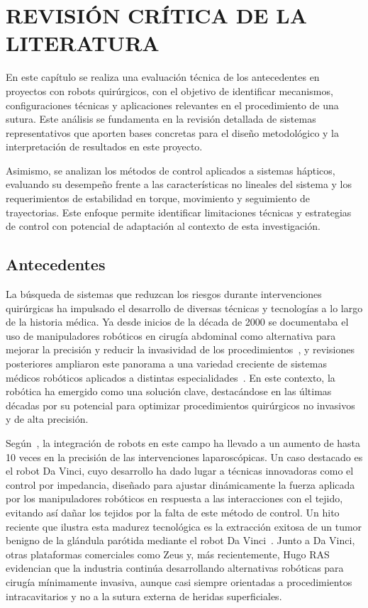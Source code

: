 \chapter{REVISIÓN CRÍTICA DE LA LITERATURA}

En este capítulo se realiza una evaluación técnica de los antecedentes en
proyectos con robots quirúrgicos, con el objetivo de identificar mecanismos,
configuraciones técnicas y aplicaciones relevantes en el procedimiento de una
sutura. Este análisis se fundamenta en la revisión detallada de sistemas
representativos que aporten bases concretas para el diseño metodológico y la
interpretación de resultados en este proyecto.

Asimismo, se analizan los métodos de control aplicados a sistemas hápticos,
evaluando su desempeño frente a las características no lineales del sistema y
los requerimientos de estabilidad en torque, movimiento y seguimiento de
trayectorias. Este enfoque permite identificar limitaciones técnicas y
estrategias de control con potencial de adaptación al
contexto de esta investigación.

\section{Antecedentes} %

La búsqueda de sistemas que reduzcan los riesgos durante intervenciones
quirúrgicas ha impulsado el desarrollo de diversas técnicas y tecnologías a lo
largo de la historia médica. Ya desde inicios de la década de 2000 se
documentaba el uso de manipuladores robóticos en cirugía abdominal como
alternativa para mejorar la precisión y reducir la invasividad de los
procedimientos~\cite{HANLY200419}, y revisiones posteriores ampliaron este
panorama a una variedad creciente de sistemas médicos robóticos aplicados a
distintas especialidades~\cite{MedicalRobots}. En este contexto, la robótica ha
emergido como una solución clave, destacándose en las últimas décadas por su
potencial para optimizar procedimientos quirúrgicos no invasivos y de alta
precisión.

Según~\cite{Historia_de_los_robots_cirujanos}, la integración de robots en este
campo ha llevado a un aumento de hasta 10 veces en la precisión de las
intervenciones laparoscópicas. Un caso destacado es el robot Da Vinci, cuyo
desarrollo ha dado lugar a técnicas innovadoras como el control por impedancia,
diseñado para ajustar dinámicamente la fuerza aplicada por los manipuladores
robóticos en respuesta a las interacciones con el tejido, evitando así dañar
los tejidos por la falta de este método de control. Un hito reciente que
ilustra esta madurez tecnológica es la extracción exitosa de un tumor benigno
de la glándula parótida mediante el robot Da Vinci~\cite{DaVinci_tumor_2024}.
Junto a Da Vinci, otras plataformas comerciales como Zeus y, más recientemente,
Hugo RAS~\cite{prata_state_2023} evidencian que la industria continúa
desarrollando alternativas robóticas para cirugía mínimamente invasiva, aunque
casi siempre orientadas a procedimientos intracavitarios y no a la sutura
externa de heridas superficiales.

